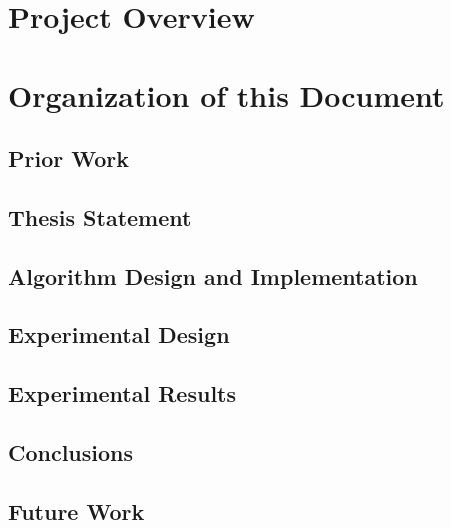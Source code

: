 \section{Project Overview}


\section{Organization of this Document}

\subsection*{Prior Work}
\subsection*{Thesis Statement}
\subsection*{Algorithm Design and Implementation}
\subsection*{Experimental Design}
\subsection*{Experimental Results}
\subsection*{Conclusions}
\subsection*{Future Work}